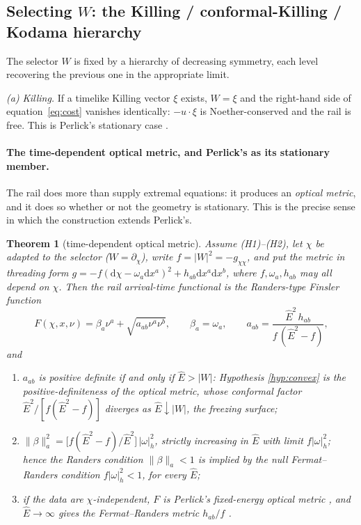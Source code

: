 \documentclass[12pt]{iopart}
\newcommand{\Ehat}{\hat E}
\newcommand{\dd}{\mathrm{d}}
\theoremstyle{plain}
\theoremstyle{definition}
\theoremstyle{plain}
\newtheorem{auxtheorem}[auxlemma]{Theorem}
\theoremstyle{remark}
\begin{document}
\subsection{Selecting $W$: the Killing / conformal-Killing / Kodama hierarchy}
\label{sec:whierarchy}
The selector $W$ is fixed by a hierarchy of decreasing symmetry, each level
recovering the previous one in the appropriate limit.

\emph{(a) Killing.} If a timelike Killing vector $\xi$ exists, $W=\xi$ and the
right-hand side of equation~\eqref{eq:cost} vanishes identically: $-u\cdot\xi$ is
Noether-conserved and the rail is free. This is Perlick's stationary case
\cite{Perlick1991}.

\paragraph{The time-dependent optical metric, and Perlick's as its stationary member.}
The rail does more than supply extremal equations: it produces an \emph{optical metric},
and it does so whether or not the geometry is stationary. This is the precise sense in
which the construction extends Perlick's.

\begin{auxtheorem}[time-dependent optical metric]\label{thm:optical}
Assume (H1)--(H2), let $\chi$ be adapted to the selector ($W=\partial_\chi$), write
$f=|W|^2=-g_{\chi\chi}$, and put the metric in threading form
$g=-f(\dd\chi-\omega_a\dd x^a)^2+h_{ab}\dd x^a\dd x^b$, where $f,\omega_a,h_{ab}$ may all
depend on $\chi$. Then the rail arrival-time functional is the Randers-type Finsler
function
\begin{equation}
   F(\chi,x,\nu)=\beta_a\nu^a+\sqrt{a_{ab}\nu^a\nu^b},
   \qquad \beta_a=\omega_a,\qquad
   a_{ab}=\frac{\Ehat^2\,h_{ab}}{f\,(\Ehat^2-f)},
   \label{eq:optical-metric}
\end{equation}
and
\begin{enumerate}
\item[(i)] $a_{ab}$ is positive definite \emph{if and only if} $\Ehat>|W|$: Hypothesis
\ref{hyp:convex} \emph{is} the positive-definiteness of the optical metric, whose conformal
factor $\Ehat^2/[f(\Ehat^2-f)]$ diverges as $\Ehat\downarrow|W|$, the freezing surface;
\item[(ii)] $\|\beta\|_a^2=\big[f(\Ehat^2-f)/\Ehat^2\big]\,|\omega|_h^2$, strictly
increasing in $\Ehat$ with limit $f|\omega|_h^2$; hence the Randers condition
$\|\beta\|_a<1$ is \emph{implied by} the null Fermat--Randers condition $f|\omega|_h^2<1$,
for every $\Ehat$;
\item[(iii)] if the data are $\chi$-independent, $F$ is Perlick's fixed-energy optical
metric \cite{Perlick1991}, and $\Ehat\to\infty$ gives the Fermat--Randers metric
$h_{ab}/f$ \cite{GibbonsWerner2008}.
\end{enumerate}
\end{auxtheorem}
\end{document}
